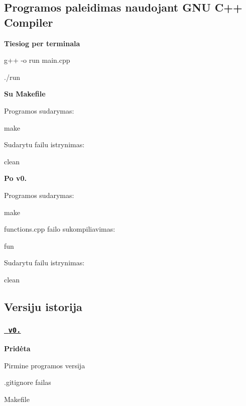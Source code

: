 \subsection*{Programos paleidimas naudojant {\ttfamily G\+NU C++ Compiler}}

{\bfseries{Tiesiog per terminala}}
\begin{DoxyItemize}
\item {\ttfamily g++ -\/o run main.\+cpp}
\item {\ttfamily ./run}
\end{DoxyItemize}

{\bfseries{Su Makefile}}

Programos sudarymas\+:
\begin{DoxyItemize}
\item {\ttfamily make}
\end{DoxyItemize}

Sudarytu failu istrynimas\+:
\begin{DoxyItemize}
\item {\ttfamily clean}
\end{DoxyItemize}

{\bfseries{Po v0.}}

Programos sudarymas\+:
\begin{DoxyItemize}
\item {\ttfamily make}
\end{DoxyItemize}

functions.\+cpp failo sukompiliavimas\+:
\begin{DoxyItemize}
\item {\ttfamily fun}
\end{DoxyItemize}

Sudarytu failu istrynimas\+:
\begin{DoxyItemize}
\item {\ttfamily clean}
\end{DoxyItemize}

\subsection*{Versiju istorija}

\subsubsection*{\href{https://github.com/simassimonas/ObjProg-2uzd/releases/tag/v0.1}{\texttt{ v0.}}}

{\bfseries{Pridėta}}
\begin{DoxyItemize}
\item Pirmine programos versija
\item .gitignore failas
\item Makefile
\end{DoxyItemize}

